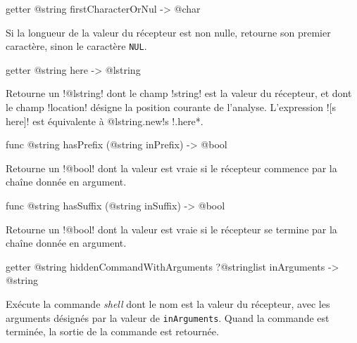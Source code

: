 
\begin{galgas3box}
getter @string firstCharacterOrNul -> @char
\end{galgas3box}

Si la longueur de la valeur du récepteur est non nulle, retourne son premier caractère, sinon le caractère \texttt{NUL}.








\begin{galgas3box}
getter @string here -> @lstring
\end{galgas3box}

Retourne un \ggst!@lstring! dont le champ \ggst!string! est la valeur du récepteur, et dont le champ \ggst!location! désigne la position courante de l'analyse. L'expression \ggst![s here]! est équivalente à \ggst*@lstring.new{!s !.here}*.









\begin{galgas4box}
func @string hasPrefix (@string inPrefix) -> @bool
\end{galgas4box}

Retourne un \ggst!@bool! dont la valeur est vraie si le récepteur commence par la chaîne donnée en argument.









\begin{galgas4box}
func @string hasSuffix (@string inSuffix) -> @bool
\end{galgas4box}

Retourne un \ggst!@bool! dont la valeur est vraie si le récepteur se termine par la chaîne donnée en argument.













\begin{galgas3box}
getter @string hiddenCommandWithArguments ?@stringlist inArguments -> @string
\end{galgas3box}
Exécute la commande \emph{shell} dont le nom est la valeur du récepteur, avec les arguments désignés par la valeur de \texttt{inArguments}. Quand la commande est terminée, la sortie de la commande est retournée.

